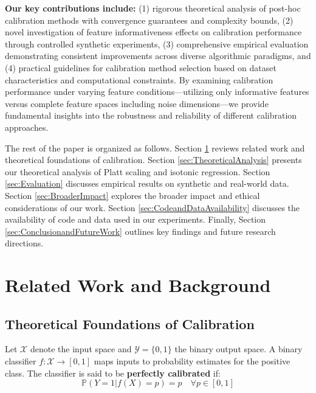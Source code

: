 \documentclass[12pt, a4paper]{article}
\begin{document}
\textbf{Our key contributions include:} (1) rigorous theoretical analysis of post-hoc calibration methods with convergence guarantees and complexity bounds, (2) novel investigation of feature informativeness effects on calibration performance through controlled synthetic experiments, (3) comprehensive empirical evaluation demonstrating consistent improvements across diverse algorithmic paradigms, and (4) practical guidelines for calibration method selection based on dataset characteristics and computational constraints. By examining calibration performance under varying feature conditions—utilizing only informative features versus complete feature spaces including noise dimensions—we provide fundamental insights into the robustness and reliability of different calibration approaches.

The rest of the paper is organized as follows. Section \ref{sec:RelatedWork} reviews related work and theoretical foundations of calibration. Section \ref{sec:TheoreticalAnalysis} presents our theoretical analysis of Platt scaling and isotonic regression. Section \ref{sec:Evaluation} discusses empirical results on synthetic and real-world data. Section \ref{sec:BroaderImpact} explores the broader impact and ethical considerations of our work. Section \ref{sec:CodeandDataAvailability} discusses the availability of code and data used in our experiments. Finally, Section \ref{sec:ConclusionandFutureWork} outlines key findings and future research directions.


\section{Related Work and Background} \label{sec:RelatedWork}

\subsection{Theoretical Foundations of Calibration}

Let $\mathcal{X}$ denote the input space and $\mathcal{Y} = \{0, 1\}$ the binary output space. A binary classifier $f: \mathcal{X} \rightarrow [0, 1]$ maps inputs to probability estimates for the positive class. The classifier is said to be \textbf{perfectly calibrated} if:
\begin{equation}
\mathbb{P}(Y = 1 | f(X) = p) = p \quad \forall p \in [0, 1]
\end{equation}
\end{document}
